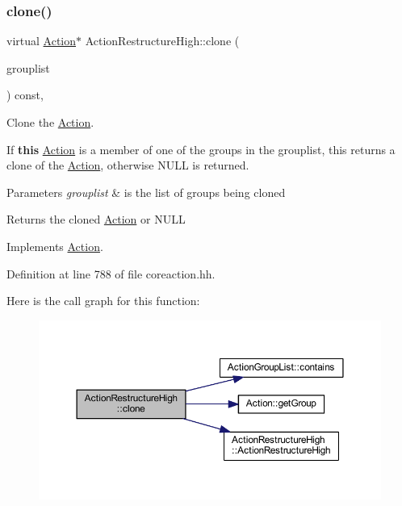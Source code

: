 \subsubsection{\texorpdfstring{clone()}{clone()}}
{\footnotesize\ttfamily virtual \mbox{\hyperlink{class_action}{Action}}$\ast$ Action\+Restructure\+High\+::clone (\begin{DoxyParamCaption}\item[{const \mbox{\hyperlink{class_action_group_list}{Action\+Group\+List}} \&}]{grouplist }\end{DoxyParamCaption}) const\hspace{0.3cm}{\ttfamily [inline]}, {\ttfamily [virtual]}}



Clone the \mbox{\hyperlink{class_action}{Action}}. 

If {\bfseries{this}} \mbox{\hyperlink{class_action}{Action}} is a member of one of the groups in the grouplist, this returns a clone of the \mbox{\hyperlink{class_action}{Action}}, otherwise N\+U\+LL is returned. 
\begin{DoxyParams}{Parameters}
{\em grouplist} & is the list of groups being cloned \\
\hline
\end{DoxyParams}
\begin{DoxyReturn}{Returns}
the cloned \mbox{\hyperlink{class_action}{Action}} or N\+U\+LL 
\end{DoxyReturn}


Implements \mbox{\hyperlink{class_action_af8242e41d09e5df52f97df9e65cc626f}{Action}}.



Definition at line 788 of file coreaction.\+hh.

Here is the call graph for this function\+:
\nopagebreak
\begin{figure}[H]
\begin{center}
\leavevmode
\includegraphics[width=350pt]{class_action_restructure_high_a1180b8277ebd3c5ce38c86fe7a72c0db_cgraph}
\end{center}
\end{figure}


